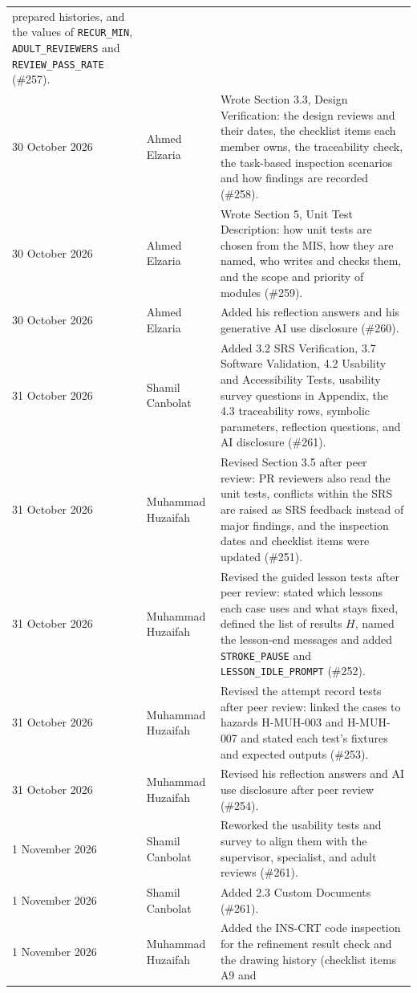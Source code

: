 \documentclass[12pt, titlepage]{article}
\begin{document}
{\begin{longtable}{@{}p{3cm}>{\raggedright\arraybackslash}p{3.3cm}
>{\raggedright\arraybackslash}p{\dimexpr\textwidth-6.3cm-4\tabcolsep\relax}@{}}
prepared histories, and the values of \texttt{RECUR\_MIN},
\texttt{ADULT\_REVIEWERS} and \texttt{REVIEW\_PASS\_RATE} (\#257).\\
30 October 2026 & Ahmed Elzaria & Wrote Section 3.3, Design Verification:
the design reviews and their dates, the checklist items each member owns,
the traceability check, the task-based inspection scenarios and how
findings are recorded (\#258).\\
30 October 2026 & Ahmed Elzaria & Wrote Section 5, Unit Test Description:
how unit tests are chosen from the MIS, how they are named, who writes and
checks them, and the scope and priority of modules (\#259).\\
30 October 2026 & Ahmed Elzaria & Added his reflection answers and his
generative AI use disclosure (\#260).\\
31 October 2026 & Shamil Canbolat & Added 3.2 SRS 
Verification, 3.7 Software Validation, 4.2 Usability and Accessibility Tests,
usability survey questions in Appendix, the 4.3 traceability rows, symbolic 
parameters, reflection questions, and AI disclosure (\#261).\\
31 October 2026 & Muhammad Huzaifah & Revised Section 3.5 after peer review:
PR reviewers also read the unit tests, conflicts within the SRS are raised
as SRS feedback instead of major findings, and the inspection dates and
checklist items were updated (\#251).\\
31 October 2026 & Muhammad Huzaifah & Revised the guided lesson tests after
peer review: stated which lessons each case uses and what stays fixed,
defined the list of results $H$, named the lesson-end messages and added
\texttt{STROKE\_PAUSE} and \texttt{LESSON\_IDLE\_PROMPT} (\#252).\\
31 October 2026 & Muhammad Huzaifah & Revised the attempt record tests after
peer review: linked the cases to hazards H-MUH-003 and H-MUH-007 and stated
each test's fixtures and expected outputs (\#253).\\
31 October 2026 & Muhammad Huzaifah & Revised his reflection answers and AI
use disclosure after peer review (\#254).\\
1 November 2026 & Shamil Canbolat & Reworked the usability tests and survey
to align them with the supervisor, specialist, and adult reviews (\#261).\\
1 November 2026 & Shamil Canbolat & Added 2.3 Custom Documents (\#261).\\
1 November 2026 & Muhammad Huzaifah & Added the INS-CRT code inspection for
the refinement result check and the drawing history (checklist items A9 and

\end{longtable}}
\end{document}
